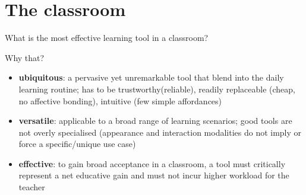 \documentclass[compress]{beamer}
\begin{document}
%
%


\section{The classroom}

 \begin{frame}[plain]
     
        \Large
     What is the most effective learning tool in a classroom?
 \end{frame}




 \begin{frame}{Why that?}

     \begin{itemize}
         \item<1-> {\bf ubiquitous}: a pervasive yet unremarkable tool
             that blend into the daily learning routine; has to be
             trustworthy(\ie reliable), readily replaceable (\ie cheap, no
             affective bonding), intuitive (\ie few simple affordances)

         \item<2-> {\bf versatile}: applicable to a broad range of learning
             scenarios; good tools are not overly specialised (appearance and
             interaction modalities do not imply or force a specific/unique use
             case)

         \item<3-> {\bf effective}: to gain broad
             acceptance in a classroom, a tool must critically
             represent a net educative gain and must not incur higher
             workload for the teacher
     \end{itemize}
 \end{frame}
\end{document}
